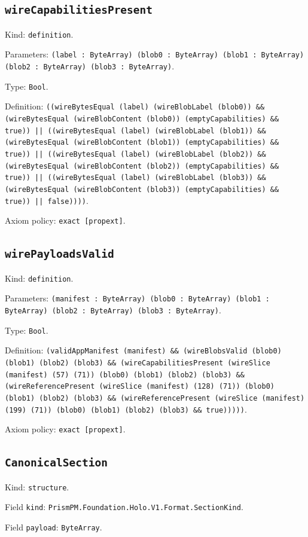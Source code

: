 \documentclass[11pt]{article}
\begin{document}
\subsection*{\texttt{wireCapabilitiesPresent}}
\noindent Kind: \texttt{definition}.\par
\noindent Parameters: \texttt{(label : ByteArray) (blob0 : ByteArray) (blob1 : ByteArray) (blob2 : ByteArray) (blob3 : ByteArray)}.\par
\noindent Type: \texttt{Bool}.\par
\noindent Definition: \texttt{((wireBytesEqual (label) (wireBlobLabel (blob0)) \&\& (wireBytesEqual (wireBlobContent (blob0)) (emptyCapabilities) \&\& true)) || ((wireBytesEqual (label) (wireBlobLabel (blob1)) \&\& (wireBytesEqual (wireBlobContent (blob1)) (emptyCapabilities) \&\& true)) || ((wireBytesEqual (label) (wireBlobLabel (blob2)) \&\& (wireBytesEqual (wireBlobContent (blob2)) (emptyCapabilities) \&\& true)) || ((wireBytesEqual (label) (wireBlobLabel (blob3)) \&\& (wireBytesEqual (wireBlobContent (blob3)) (emptyCapabilities) \&\& true)) || false))))}.\par
\noindent Axiom policy: \texttt{exact [propext]}.\par
\subsection*{\texttt{wirePayloadsValid}}
\noindent Kind: \texttt{definition}.\par
\noindent Parameters: \texttt{(manifest : ByteArray) (blob0 : ByteArray) (blob1 : ByteArray) (blob2 : ByteArray) (blob3 : ByteArray)}.\par
\noindent Type: \texttt{Bool}.\par
\noindent Definition: \texttt{(validAppManifest (manifest) \&\& (wireBlobsValid (blob0) (blob1) (blob2) (blob3) \&\& (wireCapabilitiesPresent (wireSlice (manifest) (57) (71)) (blob0) (blob1) (blob2) (blob3) \&\& (wireReferencePresent (wireSlice (manifest) (128) (71)) (blob0) (blob1) (blob2) (blob3) \&\& (wireReferencePresent (wireSlice (manifest) (199) (71)) (blob0) (blob1) (blob2) (blob3) \&\& true)))))}.\par
\noindent Axiom policy: \texttt{exact [propext]}.\par
\subsection*{\texttt{CanonicalSection}}
\noindent Kind: \texttt{structure}.\par
\noindent Field \texttt{kind}: \texttt{PrismPM.Foundation.Holo.V1.Format.SectionKind}.\par
\noindent Field \texttt{payload}: \texttt{ByteArray}.\par
\end{document}
